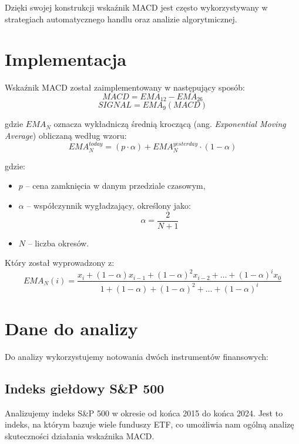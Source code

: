 \documentclass[12pt, letterpaper]{article}
\begin{document}
\bigskip
Dzięki swojej konstrukcji wskaźnik MACD jest często wykorzystywany w strategiach automatycznego handlu oraz analizie algorytmicznej.

\section{Implementacja}

Wskaźnik MACD został zaimplementowany w następujący sposób:
\begin{equation}
    MACD = EMA_{12} - EMA_{26}
\end{equation}
\begin{equation}
    SIGNAL = EMA_9(MACD)
\end{equation}

gdzie $EMA_N$ oznacza wykładniczą średnią kroczącą (ang. \textit{Exponential Moving Average}) obliczaną według wzoru:
\begin{equation}
    EMA_N^{today} = (p \cdot \alpha) + EMA_N^{yesterday} \cdot (1 - \alpha)
\end{equation}

gdzie:
\begin{itemize}
    \item $p$ – cena zamknięcia w danym przedziale czasowym,
    \item $\alpha$ – współczynnik wygładzający, określony jako:
    \begin{equation}
        \alpha = \frac{2}{N+1}
    \end{equation}
    \item $N$ – liczba okresów.
\end{itemize}

Który został wyprowadzony z:
\begin{equation}
    EMA_N(i) = \frac{x_i + (1 - \alpha)x_{i-1} + (1 - \alpha)^2 x_{i-2} + \dots + (1 - \alpha)^i x_0}
    {1 + (1 - \alpha) + (1 - \alpha)^2 + \dots + (1 - \alpha)^i}
\end{equation}

\section{Dane do analizy}

Do analizy wykorzystujemy notowania dwóch instrumentów finansowych:

\subsection{Indeks giełdowy S\&P 500}
Analizujemy indeks S\&P 500 w okresie od końca 2015 do końca 2024. Jest to indeks, na którym bazuje wiele funduszy ETF, co umożliwia nam ogólną analizę skuteczności działania wskaźnika MACD. 
\end{document}
